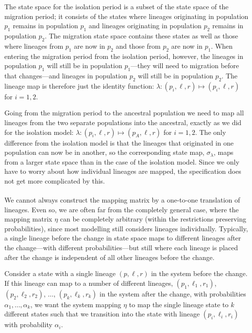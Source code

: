 The state space for the isolation period is a subset of the state space of the migration period; it consists of the states where lineages originating in population $p_1$ remains in population $p_1$ and lineages originating in population $p_2$ remains in population $p_2$. The migration state space contains these states as well as those where lineages from $p_1$ are now in $p_2$ and those from $p_2$ are now in $p_1$. When entering the migration period from the isolation period, however, the lineages in population $p_1$ will still be in population $p_1$---they will need to migration before that changes---and lineages in population $p_2$ will still be in population $p_2$. The lineage map is therefore just the identity function: $\lambda: (p_i,\ell,r)\mapsto(p_i,\ell,r)$ for $i=1,2$.

Going from the migration period to the ancestral population we need to map all lineages from the two separate populations into the ancestral, exactly as we did for the isolation model: $\lambda: (p_i,\ell,r)\mapsto (p_A,\ell,r)$ for $i=1,2$. The only difference from the isolation model is that the lineages that originated in one population can now be in another, so the corresponding state map, $\sigma_\lambda$, maps from a larger state space than in the case of the isolation model. Since we only have to worry about how individual lineages are mapped, the specification does not get more complicated by this.

\paragraph{} %
We cannot always construct the mapping matrix by a one-to-one translation of lineages. Even so, we are often far from the completely general case, where the mapping matrix $\eta$ can be completely arbitrary (within the restrictions preserving probabilities), since most modelling still considers lineages individually. Typically, a single lineage before the change in state space maps to different lineages after the change---with different probabilities---but still where each lineage is placed after the change is independent of all other lineages before the change.

Consider a state with a single lineage $(p,\ell,r)$ in the system before the change. If this lineage can map to a number of different lineages, $(p_1,\ell_1,r_1)$, $(p_2,\ell_2,r_2)$, $\ldots$, $(p_k,\ell_k,r_k)$ in the system after the change, with probabilities $\alpha_1,\ldots,\alpha_k$, we want the system mapping $\eta$ to map the single lineage state to $k$ different states such that we transition into the state with lineage $(p_i,\ell_i,r_i)$ with probability $\alpha_i$.

